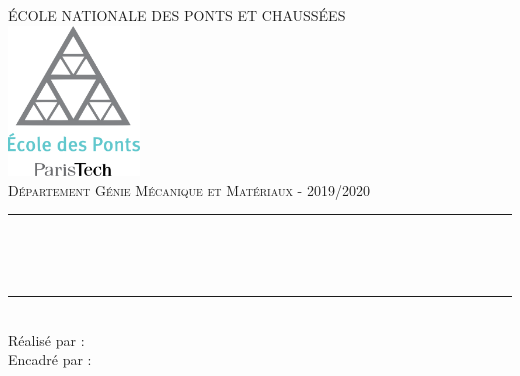 \documentclass{article}
\begin{document}
\begin{titlepage}
	\thispagestyle{empty}
	\newcommand{\HRule}{\rule{\linewidth}{0.5mm}}
	\center
	\textsc{\large ÉCOLE NATIONALE DES PONTS ET CHAUSSÉES}\\[.7cm]
	\includegraphics[width=35mm]{ENPC_logo.png}\\[.5cm]
	\textsc{\large Département Génie Mécanique et Matériaux - 2019/2020}\\[0.5cm]
	
	\vspace{2cm}
	
	\HRule \\[0.4cm]
	{\LARGE {\selectfont { PROJET3 - Matériaux Hétérogènes }}\\
    \vspace{0.4cm}
	\HRule \\[.5cm]

\vspace{2cm}
\center
\large Réalisé par : {}
\\
\vspace{1cm}
\center
Encadré par : 
\bfseries{}

}
\end{titlepage}


\newpage
\begin{center}
    \tableofcontents
\end{center}


\newpage
\end{document}
